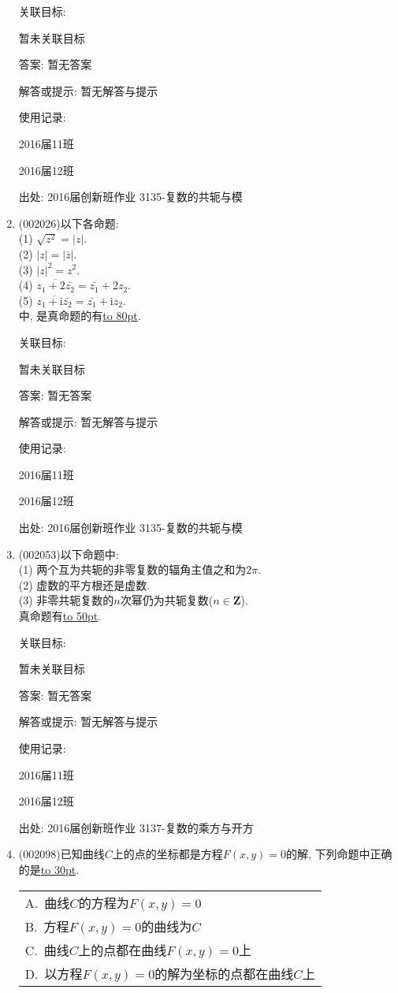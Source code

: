 \documentclass[10pt,a4paper]{article}
\newcommand{\blank}[1]{\underline{\hbox to #1pt{}}}
\newcommand{\onech}[4]{\par\begin{tabular}{p{.9\textwidth}}
A.~#1\\
B.~#2\\
C.~#3\\
D.~#4
\end{tabular}}
\begin{document}
\begin{enumerate}[1.]
关联目标:

暂未关联目标

答案: 暂无答案

解答或提示: 暂无解答与提示

使用记录:

2016届11班	

2016届12班	


出处: 2016届创新班作业	3135-复数的共轭与模
\item { (002026)}以下各命题:\\ 
(1) $\sqrt{z^2}=|z|$.\\ 
(2) $|z|=|\bar{z}|$.\\ 
(3) $|z|^2=z^2$.\\ 
(4) $\overline{z_1+2\bar{z_2}}=\bar{z_1}+2z_2$.\\ 
(5) $\overline{z_1+\mathrm{i}\bar{z_2}}=\bar{z_1}+\mathrm{i} z_2$.\\ 
中, 是真命题的有\blank{80}.


关联目标:

暂未关联目标

答案: 暂无答案

解答或提示: 暂无解答与提示

使用记录:

2016届11班	

2016届12班	


出处: 2016届创新班作业	3135-复数的共轭与模
\item { (002053)}以下命题中:\\ 
(1) 两个互为共轭的非零复数的辐角主值之和为$2\pi$.\\ 
(2) 虚数的平方根还是虚数.\\ 
(3) 非零共轭复数的$n$次幂仍为共轭复数($n\in \mathbf{Z}$).\\ 
真命题有\blank{50}.


关联目标:

暂未关联目标

答案: 暂无答案

解答或提示: 暂无解答与提示

使用记录:

2016届11班	

2016届12班	


出处: 2016届创新班作业	3137-复数的乘方与开方
\item { (002098)}已知曲线$C$上的点的坐标都是方程$F(x,y)=0$的解, 下列命题中正确的是\blank{30}.
\onech{曲线$C$的方程为$F(x,y)=0$}{方程$F(x,y)=0$的曲线为$C$}
{曲线$C$上的点都在曲线$F(x,y)=0$上}{以方程$F(x,y)=0$的解为坐标的点都在曲线$C$上}



\end{enumerate}
\end{document}
